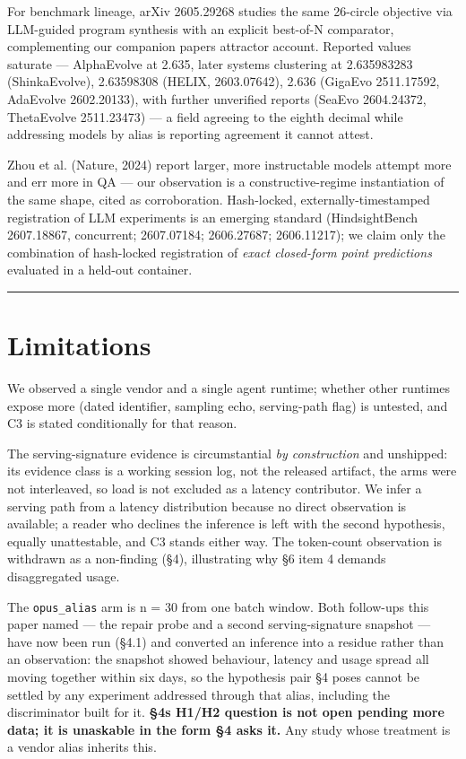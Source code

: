 For benchmark lineage, arXiv 2605.29268 studies the same 26-circle objective via LLM-guided program synthesis with an explicit best-of-N comparator, complementing our companion paper\textquotesingle s attractor account. Reported values saturate --- AlphaEvolve at 2.635, later systems clustering at 2.635983283 (ShinkaEvolve), 2.63598308 (HELIX, 2603.07642), 2.636 (GigaEvo 2511.17592, AdaEvolve 2602.20133), with further unverified reports (SeaEvo 2604.24372, ThetaEvolve 2511.23473) --- a field agreeing to the eighth decimal while addressing models by alias is reporting agreement it cannot attest.

Zhou et al. (Nature, 2024) report larger, more instructable models attempt more and err more in QA --- our observation is a constructive-regime instantiation of the same shape, cited as corroboration. Hash-locked, externally-timestamped registration of LLM experiments is an emerging standard (HindsightBench 2607.18867, concurrent; 2607.07184; 2606.27687; 2606.11217); we claim only the combination of hash-locked registration of \emph{exact closed-form point predictions} evaluated in a held-out container.

\begin{center}\rule{0.5\linewidth}{0.5pt}\end{center}

\hypertarget{limitations}{%
\section{Limitations}\label{limitations}}

We observed a single vendor and a single agent runtime; whether other runtimes expose more (dated identifier, sampling echo, serving-path flag) is untested, and C3 is stated conditionally for that reason.

The serving-signature evidence is circumstantial \emph{by construction} and unshipped: its evidence class is a working session log, not the released artifact, the arms were not interleaved, so load is not excluded as a latency contributor. We infer a serving path from a latency distribution because no direct observation is available; a reader who declines the inference is left with the second hypothesis, equally unattestable, and C3 stands either way. The token-count observation is withdrawn as a non-finding (§4), illustrating why §6 item 4 demands disaggregated usage.

The \texttt{opus\_alias} arm is n = 30 from one batch window. Both follow-ups this paper named --- the repair probe and a second serving-signature snapshot --- have now been run (§4.1) and converted an inference into a residue rather than an observation: the snapshot showed behaviour, latency and usage spread all moving together within six days, so the hypothesis pair §4 poses cannot be settled by any experiment addressed through that alias, including the discriminator built for it. \textbf{§4\textquotesingle s H1/H2 question is not open pending more data; it is unaskable in the form §4 asks it.} Any study whose treatment is a vendor alias inherits this.

